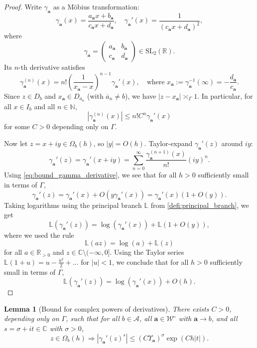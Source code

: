 \documentclass[12pt,letterpaper]{amsart}
\theoremstyle{plain}
\newtheorem{lemma}[prop]{Lemma}
\theoremstyle{definition}
\theoremstyle{remark}
\newcommand{\Aa}{\textbf{a}}
\newcommand{\C}{\mathbb{C}}
\newcommand{\R}{\mathbb{R}}
\newcommand{\CC}{\mathbb{C}}
\newcommand{\pmat}[4]{\begin{pmatrix} #1&#2\\#3&#4\end{pmatrix}}
\begin{document}
\begin{proof}
Write $\gamma_{\Aa}$ as a Möbius transformation:
\[
\gamma_{\Aa}(x) = \frac{a_{\Aa} x + b_{\Aa}}{c_{\Aa} x + d_{\Aa}}, \quad \gamma_{\Aa}'(x) = \frac{1}{(c_{\Aa} x + d_{\Aa})^2},
\]
where
\[
\gamma_{\Aa} = \pmat{a_{\Aa}}{b_{\Aa}}{c_{\Aa}}{d_{\Aa}}\in \mathrm{SL}_2(\R).
\]
Its $n$-th derivative satisfies
\[
\gamma_{\Aa}^{(n)}(x) = n! \left( \frac{1}{x_{\Aa} - x} \right)^{n - 1} \gamma_{\Aa}'(x), \quad \text{where } x_{\Aa} := \gamma_{\Aa}^{-1}(\infty) = -\frac{d_{\Aa}}{c_{\Aa}}.
\]
Since $z \in D_b$ and $x_{\Aa} \in D_{\overline{a}_n}$ (with $\overline{a}_n \neq b$), we have $|z - x_{\Aa}| \asymp_\Gamma 1 $. In particular, for all $x \in I_b$ and all $n \in \mathbb{N}$,
\begin{equation}\label{eq:bound_gamma_derivative}
|\gamma_{\Aa}^{(n)}(x)| \le n! C^n \gamma_{\Aa}'(x)
\end{equation}
for some $C > 0$ depending only on $\Gamma$.

Now let $z = x + i y \in \Omega_b(h)$, so $|y| = O(h)$. Taylor-expand $\gamma_{\Aa}'(z)$ around $iy$:
$$
\gamma_{\Aa}'(z)  = \gamma_{\Aa}'(x+iy)= \sum_{n=0}^\infty  \frac{\gamma_{\Aa}^{(n+1)}(x)}{n!} (iy)^n.
$$
Using \eqref{eq:bound_gamma_derivative}, we see that for all $h>0$ sufficiently small in terms of $\Gamma$,
\begin{equation}\label{afterTayloer}
\gamma_{\Aa}'(z) = \gamma_{\Aa}'(x) +  O( y  \gamma_{\Aa}'(x) ) = \gamma_{\Aa}'(x) \left(  1  +  O( y ) \right).
\end{equation}
Taking logarithms using the principal branch $\mathbb{L}$ from \eqref{defi:principal_branch}, we get
\[
\mathbb{L}(\gamma_{\Aa}'(z)) = \log(\gamma_{\Aa}'(x)) + \mathbb{L}\left(1 + O(y)\right),
\]
where we used the rule
$$
\mathbb{L}(az) = \log(a) + \mathbb{L}(z)
$$
for all $a\in \R_{>0}$ and $z\in \C\setminus (-\infty,0].$ Using the Taylor series $\mathbb{L}(1 + u) = u - \frac{u^2}{2} + \dots$ for $\vert u\vert < 1$, we conclude that for all $h>0$ sufficiently small in terms of $\Gamma$,
\[
\mathbb{L}(\gamma_{\Aa}'(z)) = \log(\gamma_{\Aa}'(x))  + O(h).
\]
\end{proof}

\begin{lemma}[Bound for complex powers of derivatives]\label{lem:crucial_estimate}
There exists $C > 0$, depending only on $\Gamma$, such that for all $b \in \mathcal{A}$, all $\Aa \in \mathcal{W}^\circ$ with $\Aa \to b$, and all $s = \sigma + i t \in \CC$ with $\sigma > 0$,
\[
z \in \Omega_b(h) \Longrightarrow |\gamma_{\Aa}'(z)^s| \le (C \Upsilon_{\Aa})^{\sigma} \exp(C h |t|).
\]
\end{lemma}
\end{document}

